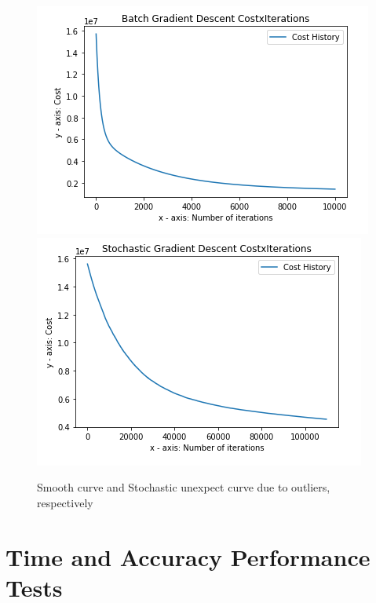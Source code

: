 \documentclass[conference]{IEEEtran}
\begin{document}
  \begin{figure}[!h]
      \centering
      \includegraphics[scale=0.28]{images/smooth-gd-curve.png}
      \includegraphics[scale=0.28]{images/smoother-curves-in-stochastic-gd.png}
      \caption{Smooth curve and Stochastic unexpect curve due to outliers, respectively}
      \label{fig1}
  \end{figure}
	
\section{Time and Accuracy Performance Tests}

	
\end{document}
